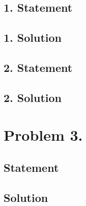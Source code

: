 \subsection{1. Statement}
\subsection{1. Solution}
\subsection{2. Statement}
\subsection{2. Solution}

\section{Problem 3.}
\subsection{Statement}
\subsection{Solution}

\EndNoBibArticle
